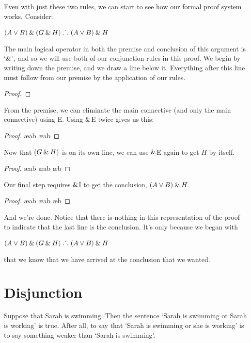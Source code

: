 Even with just these two rules, we can start to see how our formal proof system works. Consider:
\begin{earg}
\item[] $(A\vee B) \mathbin{\&} (G \mathbin{\&} H) \mathrel{\ldotp\dot{}\,\ldotp} (A\vee B)\mathbin{\&} H$
\end{earg}
The main logical operator in both the premise and conclusion of this argument is `$\mathbin{\&}$', and so we will use both of our conjunction rules in this proof. We begin by writing down the premise, and we draw a line below it. Everything after this line must follow from our premise by the application of our rules. 
\begin{proof}
	 
\end{proof}
From the premise, we can eliminate the main connective (and only the main connective) using {\eand}E. Using $\mathbin{\&}$E twice gives us this:
\begin{proof}
	 
	 \ae{ab}
	 \ae{ab}
\end{proof}
Now that $(G\mathbin{\&} H)$ is on its own line, we can use $\mathbin{\&}$E again to get $H$ by itself. 
\begin{proof}
	 
	 \ae{ab}
	 \ae{ab}
	 \ae{b}
\end{proof}
Our final step requires $\mathbin{\&}$I to get the conclusion, $(A\vee B)\mathbin{\&} H$.
\begin{proof}
	 
	 \ae{ab}
	 \ae{ab}
	 \ae{b}
	 
\end{proof}
And we're done. Notice that there is nothing in this representation of the proof to indicate that the last line is the conclusion. It's only because we began with
\begin{earg}
\item[] $(A\vee B) \mathbin{\&} (G \mathbin{\&} H) \mathrel{\ldotp\dot{}\,\ldotp} (A\vee B)\mathbin{\&} H$
\end{earg}
that we know that we have arrived at the conclusion that we wanted.
 

\section{Disjunction}\label{s:disj-rule}
Suppose that Sarah is swimming. Then the sentence `Sarah is swimming or Sarah is working' is true. After all, to say that `Sarah is swimming or she is working' is to say something weaker than `Sarah is swimming'. 

